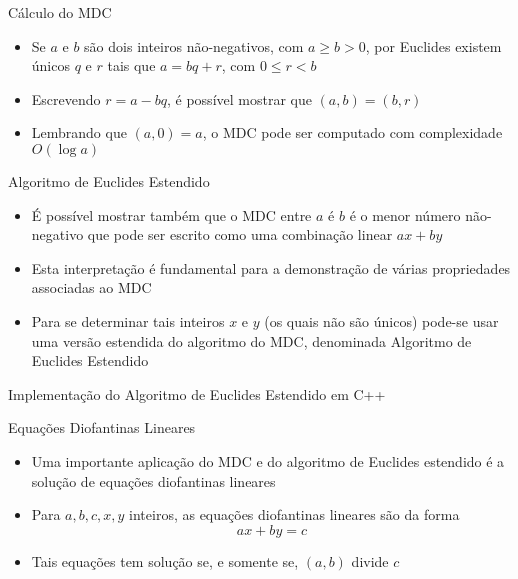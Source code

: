 \begin{frame}[fragile]{Cálculo do MDC}

    \begin{itemize}
        \item Se $a$ e $b$ são dois inteiros não-negativos, com $a \geq b > 0$, por Euclides existem únicos $q$ e $r$ tais que $a = bq + r$, com $0 \leq r < b$

        \item Escrevendo $r = a - bq$, é possível mostrar que $(a, b) = (b, r)$

        \item Lembrando que $(a, 0) = a$, o MDC pode ser computado com complexidade $O(\log a)$

            \vspace{0.1in}

    \end{itemize}

\end{frame}

\begin{frame}[fragile]{Algoritmo de Euclides Estendido}

    \begin{itemize}
        \item É possível mostrar também que o MDC entre $a$ é $b$ é o menor número não-negativo que pode ser escrito como uma combinação linear $ax + by$ 

        \item Esta interpretação é fundamental para a demonstração de várias propriedades associadas ao MDC

        \item Para se determinar tais inteiros $x$ e $y$ (os quais não são únicos) pode-se usar uma versão estendida do algoritmo do MDC, denominada Algoritmo de Euclides Estendido
    \end{itemize}

\end{frame}

\begin{frame}[fragile]{Implementação do Algoritmo de Euclides Estendido em C++}
\end{frame}

\begin{frame}[fragile]{Equações Diofantinas Lineares}

    \begin{itemize}
        \item Uma importante aplicação do MDC e do algoritmo de Euclides estendido é a solução de equações diofantinas lineares

        \item Para $a, b, c, x, y$ inteiros, as equações diofantinas lineares são da forma
            $$
            ax + by = c
            $$

        \item Tais equações tem solução se, e somente se, $(a, b)$ divide $c$
    \end{itemize}

\end{frame}

